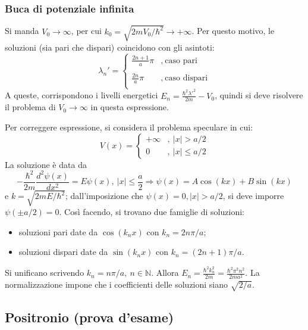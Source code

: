 \documentclass[11pt, a4paper]{scrartcl} %
\numberwithin{equation}{subsection}
\theoremstyle{style2}
\theoremstyle{style1}
\begin{document}
\subsubsection{Buca di potenziale infinita}
Si manda $V_0 \to \infty$, per cui $k_0 = \sqrt{2m V_0 / \hbar ^2} \to +\infty$. 
Per questo motivo, le soluzioni (sia pari che dispari) coincidono con gli asintoti:
\begin{equation}
	\lambda _n ' = \begin{cases}
		\displaystyle \frac{2n+1}{a} \pi & ,\ \text{caso pari}\\
		\\
		\displaystyle \frac{2n}{a} \pi & ,\ \text{caso dispari}\\
	\end{cases} 
\end{equation}
A queste, corrispondono i livelli energetici $E_n = \frac{\hbar ^2 \lambda '^2}{2m} - V_0$, quindi si deve risolvere il problema di $V_0 \to \infty$ in questa espressione.

Per correggere espressione, si considera il problema speculare in cui:
\[
	V(x)=
\begin{cases}
	+\infty &, \ \lvert x \rvert > a / 2\\
	0 &, \ \lvert x \rvert \le a / 2
\end{cases}
\] 
La soluzione \`e data da
\begin{equation}
	-\frac{\hbar ^2}{2m} \frac{d ^2 \psi (x)}{d x^2}  = E \psi (x) , \ \lvert x \rvert \le \frac{a}{2} \Rightarrow  \psi  (x) = A \cos(kx) + B \sin(kx)
\end{equation}
e $k = \sqrt{2mE / \hbar ^2} $; dall'imposizione che $\psi (x) = 0 , \lvert x \rvert > a / 2$, si deve imporre $\psi (\pm a / 2) =0$.
Cos\`i facendo, si trovano due famiglie di soluzioni:
\begin{itemize}
	\item soluzioni pari date da $\cos(k_nx)$ con $k_n = 2n \pi / a$;
	\item soluzioni dispari date da $\sin(k_nx) $ con $k_n = (2n+1) \pi / a$.
\end{itemize}
Si unificano scrivendo $k_n = n \pi / a, \ n \in \mathbb{N}$. 
Allora $E_n = \frac{\hbar ^2 k_n^2}{2m} =  \frac{\hbar ^2 \pi^2 n^2}{2ma^2}$.
La normalizzazione impone che i coefficienti delle soluzioni siano $\sqrt{2 / a} $. 

\subsection{Positronio (prova d'esame)}
\end{document}
